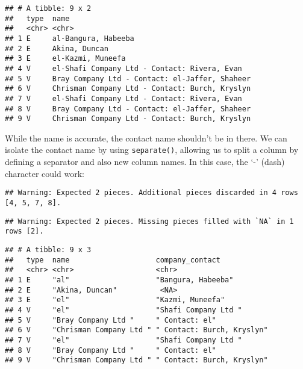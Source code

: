 \documentclass[
]{book}
\newenvironment{Shaded}{\begin{snugshade}}{\end{snugshade}}
\newcommand{\DataTypeTok}[1]{\textcolor[rgb]{0.13,0.29,0.53}{#1}}
\newcommand{\KeywordTok}[1]{\textcolor[rgb]{0.13,0.29,0.53}{\textbf{#1}}}
\newcommand{\NormalTok}[1]{#1}
\newcommand{\OperatorTok}[1]{\textcolor[rgb]{0.81,0.36,0.00}{\textbf{#1}}}
\newcommand{\StringTok}[1]{\textcolor[rgb]{0.31,0.60,0.02}{#1}}
\begin{document}
\begin{verbatim}
## # A tibble: 9 x 2
##   type  name                                          
##   <chr> <chr>                                         
## 1 E     al-Bangura, Habeeba                           
## 2 E     Akina, Duncan                                 
## 3 E     el-Kazmi, Muneefa                             
## 4 V     el-Shafi Company Ltd - Contact: Rivera, Evan  
## 5 V     Bray Company Ltd - Contact: el-Jaffer, Shaheer
## 6 V     Chrisman Company Ltd - Contact: Burch, Kryslyn
## 7 V     el-Shafi Company Ltd - Contact: Rivera, Evan  
## 8 V     Bray Company Ltd - Contact: el-Jaffer, Shaheer
## 9 V     Chrisman Company Ltd - Contact: Burch, Kryslyn
\end{verbatim}

While the name is accurate, the contact name shouldn't be in there. We can isolate the contact name by using \texttt{separate()}, allowing us to split a column by defining a separator and also new column names. In this case, the `-' (dash) character could work:

\begin{Shaded}
\end{Shaded}

\begin{verbatim}
## Warning: Expected 2 pieces. Additional pieces discarded in 4 rows [4, 5, 7, 8].
\end{verbatim}

\begin{verbatim}
## Warning: Expected 2 pieces. Missing pieces filled with `NA` in 1 rows [2].
\end{verbatim}

\begin{verbatim}
## # A tibble: 9 x 3
##   type  name                    company_contact           
##   <chr> <chr>                   <chr>                     
## 1 E     "al"                    "Bangura, Habeeba"        
## 2 E     "Akina, Duncan"          <NA>                     
## 3 E     "el"                    "Kazmi, Muneefa"          
## 4 V     "el"                    "Shafi Company Ltd "      
## 5 V     "Bray Company Ltd "     " Contact: el"            
## 6 V     "Chrisman Company Ltd " " Contact: Burch, Kryslyn"
## 7 V     "el"                    "Shafi Company Ltd "      
## 8 V     "Bray Company Ltd "     " Contact: el"            
## 9 V     "Chrisman Company Ltd " " Contact: Burch, Kryslyn"
\end{verbatim}
\end{document}

